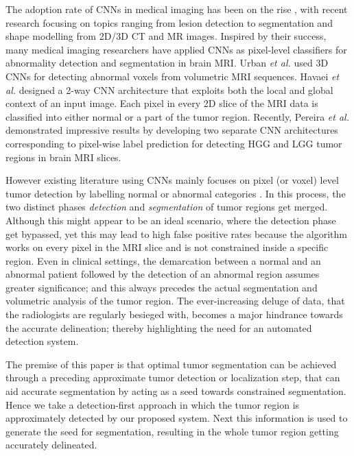 \documentclass[journal,twocolumn]{IEEEtran}
\begin{document}
The adoption rate of CNNs in medical imaging  has been on the rise \cite{Greenspan2016_guest_survey}, with recent research focusing on topics ranging from lesion detection \cite{Setio2016pulmonary, Summers2015improving, Dou2016automatic, Sirinukunwattana2016locality} to segmentation and shape modelling \cite{Ghesu2016marginal, Brosch2016deep, Pereira2016} from 2D/3D CT and MR images. Inspired by their success, many  medical imaging researchers   have applied CNNs as pixel-level classifiers for abnormality detection and segmentation in brain MRI. Urban \emph{et al.} \cite{Urban2014_brats} used 3D CNNs for detecting abnormal voxels from volumetric MRI sequences. Havaei \emph{et al.} \cite{Davy2015_brats} designed  a 2-way CNN architecture that exploits both the local and global context of an input image. Each pixel in every 2D slice of the MRI data is classified into either normal or a part of the tumor region. Recently, Pereira \emph{et al.} \cite{Pereira2016} demonstrated impressive results by developing  two separate CNN  architectures corresponding  to  pixel-wise label prediction  for detecting HGG and LGG tumor regions in brain MRI slices.

However existing literature  using CNNs mainly focuses on pixel (or voxel) level tumor detection by labelling normal or abnormal categories \cite{Urban2014_brats,Zikic2014_brats,Davy2015_brats, Pereira2016}.
In this process, the two distinct phases  \textit{detection} and \textit{segmentation} of tumor regions get merged. Although this might appear to be  an ideal scenario, where   the detection phase get bypassed, yet  this  may lead to high false positive rates because  the algorithm works on every pixel in the MRI slice and is not constrained inside a specific  region. Even in clinical settings, the demarcation between a normal and an abnormal patient followed by the detection of an abnormal region assumes greater  significance; and this always precedes the actual segmentation and volumetric analysis of the tumor region. The ever-increasing deluge  of data, that the radiologists are regularly  besieged with, becomes  a major hindrance towards the accurate delineation; thereby highlighting  the need for an automated detection system.

The premise of this paper is that optimal tumor segmentation can be achieved through a preceding approximate tumor detection or localization step, that can aid accurate segmentation by acting as a seed towards constrained segmentation. Hence we take a detection-first approach in which the tumor region is approximately detected by our proposed system. Next this information  is used to generate the seed for segmentation, resulting in the whole tumor region getting accurately  delineated.
\end{document}
